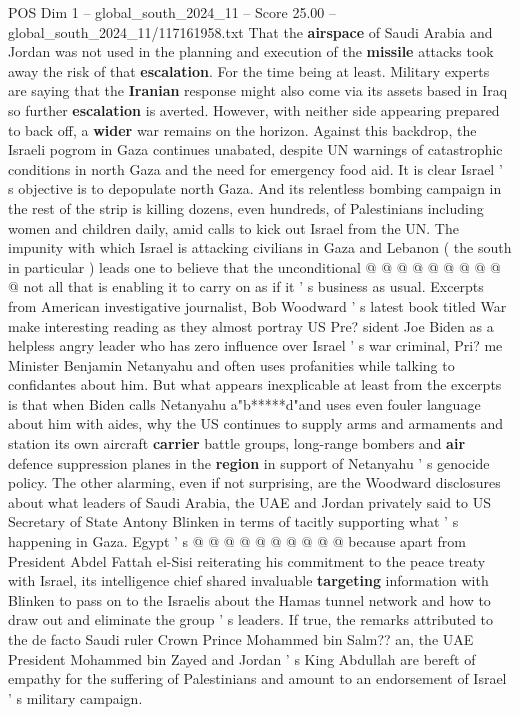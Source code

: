 \begin{textsample}{POS Dim 1 – global\_south\_2024\_11 – Score 25.00 – global\_south\_2024\_11/117161958.txt}
That the \textbf{airspace} of Saudi Arabia and Jordan was not used in the planning and execution of the \textbf{missile} attacks took away the risk of that \textbf{escalation}.
For the time being at least.
Military experts are saying that the \textbf{Iranian} response might also come via its assets based in Iraq so further \textbf{escalation} is averted.
However, with neither side appearing prepared to back off, a \textbf{wider} war remains on the horizon.
Against this backdrop, the Israeli pogrom in Gaza continues unabated, despite UN warnings of catastrophic conditions in north Gaza and the need for emergency food aid.
It is clear Israel ' s objective is to depopulate north Gaza.
And its relentless bombing campaign in the rest of the strip is killing dozens, even hundreds, of Palestinians including women and children daily, amid calls to kick out Israel from the UN.
The impunity with which Israel is attacking civilians in Gaza and Lebanon ( the south in particular ) leads one to believe that the unconditional @ @ @ @ @ @ @ @ @ @ not all that is enabling it to carry on as if it ' s business as usual.
Excerpts from American investigative journalist, Bob Woodward ' s latest book titled War make interesting reading as they almost portray US Pre? sident Joe Biden as a helpless angry leader who has zero influence over Israel ' s war criminal, Pri? me Minister Benjamin Netanyahu and often uses profanities while talking to confidantes about him.
But what appears inexplicable at least from the excerpts is that when Biden calls Netanyahu a"b*****d"and uses even fouler language about him with aides, why the US continues to supply arms and armaments and station its own aircraft \textbf{carrier} battle groups, long-range bombers and \textbf{air} defence suppression planes in the \textbf{region} in support of Netanyahu ' s genocide policy.
The other alarming, even if not surprising, are the Woodward disclosures about what leaders of Saudi Arabia, the UAE and Jordan privately said to US Secretary of State Antony Blinken in terms of tacitly supporting what ' s happening in Gaza.
Egypt ' s @ @ @ @ @ @ @ @ @ @ because apart from President Abdel Fattah el-Sisi reiterating his commitment to the peace treaty with Israel, its intelligence chief shared invaluable \textbf{targeting} information with Blinken to pass on to the Israelis about the Hamas tunnel network and how to draw out and eliminate the group ' s leaders.
If true, the remarks attributed to the de facto Saudi ruler Crown Prince Mohammed bin Salm?? an, the UAE President Mohammed bin Zayed and Jordan ' s King Abdullah are bereft of empathy for the suffering of Palestinians and amount to an endorsement of Israel ' s military campaign.

\end{textsample}
